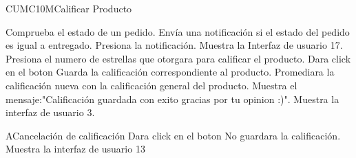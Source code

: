 
\begin{UseCase}{CUMC10M}{Calificar Producto}{%
}
	\end{UseCase}
	
	
	\begin{UCtrayectoria}
		\UCpaso Comprueba el estado de un pedido.
		\UCpaso Envía una notificación si el estado del pedido es igual a entregado.
		\UCpaso[\UCactor]Presiona la notificación.
		\UCpaso Muestra la Interfaz de usuario 17.
		\UCpaso[\UCactor]Presiona el numero de estrellas que otorgara para calificar el producto.
		\UCpaso[\UCactor] Dara click en el boton 
		\UCpaso Guarda la calificación correspondiente al producto.
		\UCpaso Promediara la calificación nueva con la calificación general del producto.
		\UCpaso Muestra el mensaje:"Calificación guardada con exito gracias por tu opinion :)".%
		\UCpaso Muestra la interfaz de usuario 3.
	\end{UCtrayectoria}
	

	\begin{UCtrayectoriaA}{A}{Cancelación de calificación}
		\UCpaso[\UCactor]Dara click en el boton 
		\UCpaso No guardara la calificación.
		\UCpaso Muestra la interfaz de usuario 13
	\end{UCtrayectoriaA}